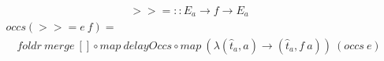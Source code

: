 \documentclass[fleqn]{amsart}
\begin{document}
\begin{align*}
  >>= :: E_a \rightarrow f \rightarrow E_a
\end{align*}
\begin{align*}
  &occs(>>= e\ f) =\\
  &\quad foldr\ merge\ []\circ map\ delayOccs\circ map\ (\lambda(\hat{t}_a, a) \rightarrow (\hat{t}_a , f\ a))\ (occs\ e)
\end{align*}
\end{document}
